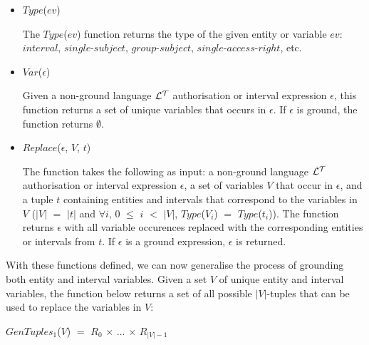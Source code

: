 \documentclass[11pt]{report}
\newenvironment{vquote}
{
  \begin{list}{}{\leftmargin 1em}\item[]
}
{
  \end{list}
}
\begin{document}
            \begin{itemize}
              \item
                $Type$($ev$)

                The $Type$($ev$) function returns the type of the given
                entity or variable $ev$: $interval$, $single$-$subject$,
                $group$-$subject$, $single$-$access$-$right$, etc.

              \item
                $Var$($\epsilon$)

                Given a non-ground language ${\cal L^T}$ authorisation or
                interval expression $\epsilon$, this function returns
                a set of unique variables that occurs in $\epsilon$. If
                $\epsilon$ is ground, the function returns $\emptyset$.

              \item
                $Replace$($\epsilon$, $V$, $t$)

                The function takes the following as input: a non-ground
                language ${\cal L^T}$ authorisation or interval expression
                $\epsilon$, a set of variables $V$ that occur in
                $\epsilon$, and a tuple $t$ containing entities and
                intervals that correspond to the variables in $V$ ($|V|$ $=$
                $|t|$ and $\forall$$i$, $0$ $\leq$ $i$ $<$ $|V|$,
                $Type$($V_i$) $=$ $Type$($t_i$)). The function returns
                $\epsilon$ with all variable occurences replaced with the
                corresponding entities or intervals from $t$. If
                $\epsilon$ is a ground expression, $\epsilon$ is
                returned.
            \end{itemize}

            With these functions defined, we can now generalise the process
            of grounding both entity and interval variables. Given a set $V$
            of unique entity and interval variables, the function below
            returns a set of all possible $|V|$-tuples that can be used to
            replace the variables in $V$:

            \begin{vquote}
              $GenTuples_1$($V$) $=$
              $R_0$ $\times$ $\ldots$ $\times$ $R_{|V|-1}$
            \end{vquote}
\end{document}
